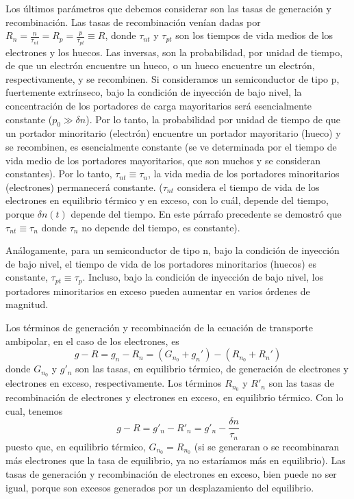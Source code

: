\documentclass[12pt,a4paper]{article}
\begin{document}
Los últimos parámetros que debemos considerar son las tasas de generación y recombinación. Las tasas de recombinación venían dadas por $R_{n}=\frac{n}{\tau _{nt}}=R_{p}=\frac{p}{\tau _{pt}} \equiv R$, donde $\tau _{nt}$ y $\tau _{pt}$ son los tiempos de vida medios de los electrones y los huecos. Las inversas, son la probabilidad, por unidad de tiempo, de que un electrón encuentre un hueco, o un hueco encuentre un electrón, respectivamente, y se recombinen. Si consideramos un semiconductor de tipo p, fuertemente extrínseco, bajo la condición de inyección de bajo nivel, la concentración de los portadores de carga mayoritarios será esencialmente constante ($p_{0}\gg \delta n$). Por lo tanto, la probabilidad por unidad de tiempo de que un portador minoritario (electrón) encuentre un portador mayoritario (hueco) y se recombinen, es esencialmente constante (se ve determinada por el tiempo de vida medio de los portadores mayoritarios, que son muchos y se consideran constantes). Por lo tanto, $\tau _{nt} \equiv \tau _{n}$, la vida media de los portadores minoritarios (electrones) permanecerá constante. ($\tau _{nt}$ considera el tiempo de vida de los electrones en equilibrio térmico y en exceso, con lo cuál, depende del tiempo, porque $\delta n(t)$ depende del tiempo. En este párrafo precedente se demostró que $\tau _{nt} \equiv \tau _{n}$ donde $\tau _{n}$ no depende del tiempo, es constante).

Análogamente, para un semiconductor de tipo n, bajo la condición de inyección de bajo nivel, el tiempo de vida de los portadores minoritarios (huecos) es constante, $\tau _{pt} \equiv \tau _{p}$. Incluso, bajo la condición de inyección de bajo nivel, los portadores minoritarios en exceso pueden aumentar en varios órdenes de magnitud.

Los términos de generación y recombinación de la ecuación de transporte ambipolar, en el caso de los electrones, es
\[ g-R = g_{n}-R_{n}=(G_{n_{0}} + g_{n}') - (R_{n_{0}}+R_{n}') \]
donde $G_{n_{0}}$ y $g'_{n}$ son las tasas, en equilibrio térmico, de generación de electrones y electrones en exceso, respectivamente. Los términos $R_{n_{0}}$ y $R'_{n}$ son las tasas de recombinación de electrones y electrones en exceso, en equilibrio térmico. Con lo cual, tenemos
\[ g-R=g'_{n} - R'_{n}=g'_{n}-\frac{\delta n}{\tau _{n}} \]
puesto que, en equilibrio térmico, $G_{n_{0}}=R_{n_{0}}$ (si se generaran o se recombinaran más electrones que la tasa de equilibrio, ya no estaríamos más en equilibrio). Las tasas de generación y recombinación de electrones en exceso, bien puede no ser igual, porque son excesos generados por un desplazamiento del equilibrio.
\end{document}
